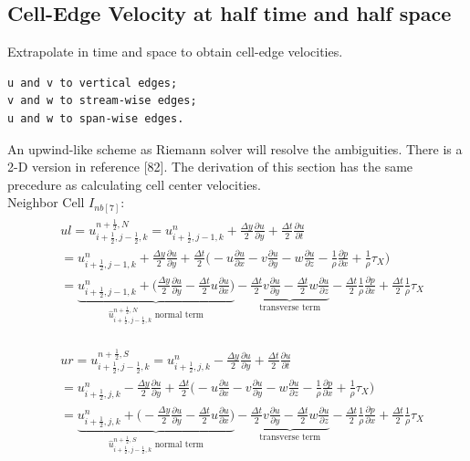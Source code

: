 \documentclass{article}
\numberwithin{equation}{subsection}
\begin{document}
\subsection{Cell-Edge Velocity at half time and half space}
Extrapolate in time and space to obtain cell-edge velocities.  
\begin{lstlisting}[frame=single]
u and v to vertical edges;
v and w to stream-wise edges;
u and w to span-wise edges.
\end{lstlisting}
An upwind-like scheme as Riemann solver will resolve the ambiguities. There is a 2-D version in reference [82]. The derivation of this section has the same precedure as calculating cell center velocities.\\

Neighbor Cell $I_{nb[7]}$:
\begin{align}
\begin{split}
& ul = u_{i+\frac{1}{2},j-\frac{1}{2},k}^{n+\frac{1}{2},N} = u_{i+\frac{1}{2},j-1,k}^n + \frac{\Delta y}{2}\frac{\partial u}{\partial y} + \frac{\Delta t}{2}\frac{\partial u}{\partial t}\\
&= u_{i+\frac{1}{2},j-1,k}^n + \frac{\Delta y}{2} \frac{\partial u}{\partial y} + \frac{\Delta t}{2} \Big( -u\frac{\partial u}{\partial x} -v\frac{\partial u}{\partial y} -w\frac{\partial u}{\partial z} - \frac{1}{\rho}\frac{\partial p}{\partial x} +\frac{1}{\rho}\tau_X\Big) \\
&= \underbrace{u_{i+\frac{1}{2},j-1,k}^n + \Big(\frac{\Delta y}{2}\frac{\partial u}{\partial y} - \frac{\Delta t}{2} u\frac{\partial u}{\partial x}\Big)}_\text{$\widehat{u}_{i+\frac{1}{2},j-\frac{1}{2},k}^{n+\frac{1}{2},N}$ normal term} -\underbrace{\frac{\Delta t}{2}v\frac{\partial u}{\partial y} - \frac{\Delta t}{2}w\frac{\partial u}{\partial z}}_\text{transverse term} - \frac{\Delta t}{2}\frac{1}{\rho}\frac{\partial p}{\partial x} + \frac{\Delta t}{2}\frac{1}{\rho}\tau_X
\end{split}
\end{align}

\begin{align}
\begin{split}
& ur = u_{i+\frac{1}{2},j-\frac{1}{2},k}^{n+\frac{1}{2},S} = u_{i+\frac{1}{2},j,k}^n - \frac{\Delta y}{2}\frac{\partial u}{\partial y} + \frac{\Delta t}{2}\frac{\partial u}{\partial t}\\
&= u_{i+\frac{1}{2},j,k}^n - \frac{\Delta y}{2} \frac{\partial u}{\partial y} + \frac{\Delta t}{2} \Big( -u\frac{\partial u}{\partial x} -v\frac{\partial u}{\partial y} -w\frac{\partial u}{\partial z} - \frac{1}{\rho}\frac{\partial p}{\partial x} +\frac{1}{\rho}\tau_X\Big) \\
&= \underbrace{u_{i+\frac{1}{2},j,k}^n + \Big(-\frac{\Delta y}{2}\frac{\partial u}{\partial y} - \frac{\Delta t}{2} u\frac{\partial u}{\partial x}\Big)}_\text{$\widehat{u}_{i+\frac{1}{2},j-\frac{1}{2},k}^{n+\frac{1}{2},S}$ normal term} -\underbrace{\frac{\Delta t}{2}v\frac{\partial u}{\partial y} - \frac{\Delta t}{2}w\frac{\partial u}{\partial z}}_\text{transverse term} - \frac{\Delta t}{2}\frac{1}{\rho}\frac{\partial p}{\partial x} + \frac{\Delta t}{2}\frac{1}{\rho}\tau_X
\end{split}
\end{align}
\end{document}
